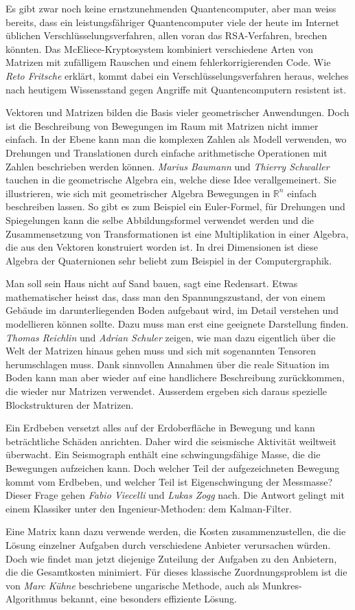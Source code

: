 Es gibt zwar noch keine ernstzunehmenden Quantencomputer, aber man weiss
bereits, dass ein leistungsfähriger Quantencomputer viele der heute
im Internet üblichen Verschlüsselungsverfahren, allen voran das RSA-Verfahren,
brechen könnten.
Das McEliece-Kryptosystem kombiniert verschiedene Arten von Matrizen
mit zufälligem Rauschen und einem fehlerkorrigierenden Code.
Wie {\em Reto Fritsche} erklärt, kommt dabei ein Verschlüsselungsverfahren
heraus, welches nach heutigem Wissensstand gegen Angriffe mit
Quantencomputern resistent ist.

Vektoren und Matrizen bilden die Basis vieler geometrischer
Anwendungen.
Doch ist die Beschreibung von Bewegungen im Raum mit Matrizen nicht
immer einfach.
In der Ebene kann man die komplexen Zahlen als Modell verwenden,
wo Drehungen und Translationen durch einfache arithmetische
Operationen mit Zahlen beschrieben werden können.
{\em Marius Baumann} und {\em Thierry Schwaller} tauchen in die
geometrische Algebra ein, welche diese Idee verallgemeinert.
Sie illustrieren, wie sich mit geometrischer Algebra Bewegungen
in $\mathbb{R}^n$ einfach beschreiben lassen.
So gibt es zum Beispiel ein Euler-Formel, für Drehungen und Spiegelungen
kann die selbe Abbildungsformel verwendet werden und die Zusammensetzung
von Transformationen ist eine Multiplikation in einer Algebra, die
aus den Vektoren konstruiert worden ist.
In drei Dimensionen ist diese Algebra der Quaternionen sehr
beliebt zum Beispiel in der Computergraphik.

Man soll sein Haus nicht auf Sand bauen, sagt eine Redensart.
Etwas mathematischer heisst das, dass man den Spannungszustand,
der von einem Gebäude im darunterliegenden Boden aufgebaut wird,
im Detail verstehen und modellieren können sollte.
Dazu muss man erst eine geeignete Darstellung finden.
{\em Thomas Reichlin} und {\em Adrian Schuler} zeigen, wie man 
dazu eigentlich über die Welt der Matrizen hinaus gehen muss und
sich mit sogenannten Tensoren herumschlagen muss.
Dank sinnvollen Annahmen über die reale Situation im Boden
kann man aber wieder auf eine handlichere Beschreibung zurückkommen,
die wieder nur Matrizen verwendet.
Ausserdem ergeben sich daraus spezielle Blockstrukturen der
Matrizen.

Ein Erdbeben versetzt alles auf der Erdoberfläche in Bewegung und
kann beträchtliche Schäden anrichten.
Daher wird die seismische Aktivität weiltweit überwacht.
Ein Seismograph enthält eine schwingungsfähige Masse, die die Bewegungen
aufzeichen kann.
Doch welcher Teil der aufgezeichneten Bewegung kommt vom Erdbeben,
und welcher Teil ist Eigenschwingung der Messmasse?
Dieser Frage gehen {\em Fabio Viecelli} und {\em Lukas Zogg} nach.
Die Antwort gelingt mit einem Klassiker unter den Ingenieur-Methoden:
dem Kalman-Filter.

Eine Matrix kann dazu verwende werden, die Kosten zusammenzustellen,
die die Lösung einzelner Aufgaben durch verschiedene Anbieter
verursachen würden.
Doch wie findet man jetzt diejenige Zuteilung der Aufgaben
zu den Anbietern, die die Gesamtkosten minimiert.
Für dieses klassische Zuordnungsproblem ist die
von {\em Marc Kühne} beschriebene ungarische Methode,
auch als Munkres-Algorithmus bekannt, eine besonders effiziente
Lösung.



